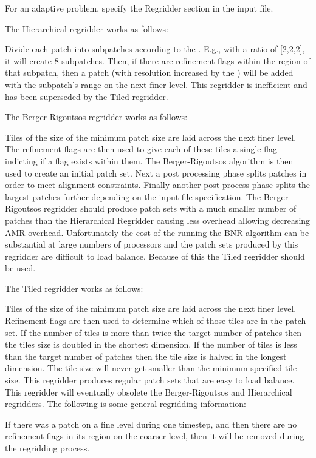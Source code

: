 For an adaptive problem, specify the Regridder section in the input
file.
 
The Hierarchical regridder works as follows: 

Divide each patch into subpatches according to the
. E.g., with a ratio of [2,2,2], it will
create 8 subpatches. Then, if there are refinement flags within the
region of that subpatch, then a patch (with resolution increased by
the ) will be added with the subpatch's range on
the next finer level. This regridder is inefficient and has been
superseded by the Tiled regridder.

The Berger-Rigoutsos regridder works as follows: 

Tiles of the size of the minimum patch size are laid across the next
finer level. The refinement flags are then used to give each of these
tiles a single flag indicting if a flag exists within them. The
Berger-Rigoutsos algorithm is then used to create an initial patch
set. Next a post processing phase splits patches in order to meet
alignment constraints. Finally another post process phase splits the
largest patches further depending on the  input
file specification. The Berger-Rigoutsos regridder should produce
patch sets with a much smaller number of patches than the Hierarchical
Regridder causing less overhead allowing decreasing AMR
overhead. Unfortunately the cost of the running the BNR algorithm can
be substantial at large numbers of processors and the patch sets
produced by this regridder are difficult to load balance. Because of
this the Tiled regridder should be used.

The Tiled regridder works as follows: 

Tiles of the size of the minimum patch size are laid across the next
finer level. Refinement flags are then used to determine which of
those tiles are in the patch set. If the number of tiles is more than
twice the target number of patches then the tiles size is doubled in
the shortest dimension. If the number of tiles is less than the target
number of patches then the tile size is halved in the longest
dimension. The tile size will never get smaller than the minimum
specified tile size. This regridder produces regular patch sets that
are easy to load balance. This regridder will eventually obsolete the
Berger-Rigoutsos and Hierarchical regridders.  The following is some
general regridding information:

If there was a patch on a fine level during one timestep, and then
there are no refinement flags in its region on the coarser level, then
it will be removed during the regridding process.

